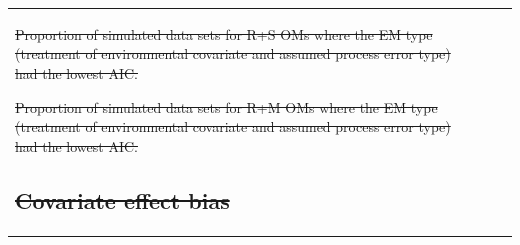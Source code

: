 \documentclass[
  12pt,
]{article}
\makeatletter
\providecommand{\DIFdel}[1]{{\protect\color{red}\sout{#1}}} %
\providecommand{\DIFdelFL}[1]{\DIFdel{#1}} %
\let\sout@orig\sout %
\renewcommand{\sout}[1]{\ifmmode\text{\sout@orig{\ensuremath{#1}}}\else\sout@orig{#1}\fi} %
\makeatother
\begin{document}
\begin{table}
{\begin{center}
\begin{tabular}{lrrr}
{%
\DIFdelFL{Proportion of simulated data sets for R+S OMs where the EM type (treatment of environmental covariate and assumed process error type) had the lowest AIC.}}%

{%
\DIFdelFL{Proportion of simulated data sets for R+M OMs where the EM type (treatment of environmental covariate and assumed process error type) had the lowest AIC.}}%

\subsection*{\DIFdel{Covariate effect bias}}%
\addcontentsline{toc}{subsection}{\DIFdel{Covariate effect bias}}


\end{tabular}
\end{center}}
\end{table}
\end{document}
